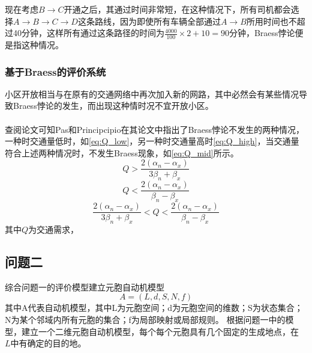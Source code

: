 \documentclass[fontset=windows,a4paper,12pt]{ctexart}
\newcommand{\upcite}[1]{\textsuperscript{\textsuperscript{\cite{#1}}}}
\begin{document}
			现在考虑$ B \rightarrow C $开通之后，其通过时间非常短，在这种情况下，所有司机都会选择$ A \rightarrow B \rightarrow C \rightarrow D $这条路线，因为即使所有车辆全部通过$ A \rightarrow B $所用时间也不超过40分钟，这样所有通过这条路径的时间为$ \frac{4000}{100}\times 2+10=90$分钟，Braess悖论便是指这种情况。
			\subsubsection{基于Braess的评价系统}
			小区开放相当与在原有的交通网络中再次加入新的网路，其中必然会有某些情况导致Braess悖论的发生，而出现这种情时况不宜开放小区。
			
			查阅论文可知Pas和Principcipio在其论文中指出了Braess悖论不发生的两种情况\upcite{pas1997braess}，一种时交通量低时，如\ref{eq:Q_low}，另一种时交通量高时\ref{eq:Q_high}，当交通量符合上述两种情况时，不发生Braess现象，如\ref{eq:Q_mid}所示。
			\begin{equation}
			Q>\frac{2(\alpha_n-\alpha_x)}{3\beta_n+\beta_x}
			\label{eq:Q_low}
			\end{equation}
			\begin{equation}
			Q<\frac{2(\alpha_n-\alpha_x)}{\beta_n-\beta_x}
			\label{eq:Q_high}
			\end{equation}
			\begin{equation}
			\frac{2(\alpha_n-\alpha_x)}{3\beta_n+\beta_x}<Q<\frac{2(\alpha_n-\alpha_x)}{\beta_n-\beta_x}
			\label{eq:Q_mid}
			\end{equation}
			其中$ Q $为交通需求，		
	\subsection{问题二}
		综合问题一的评价模型建立元胞自动机模型
		\begin{equation}
			A=(L,d,S,N,f)
		\end{equation}
		其中A代表自动机模型，其中L为元胞空间；d为元胞空间的维数；S为状态集合；N为某个邻域内所有元胞的集合；f为局部映射或局部规则。
		根据问题一中的模型，建立一个二维元胞自动机模型，每个每个元胞具有几个固定的生成地点，在
		$ L $中有确定的目的地。
  \newpage
  
  
\end{document}
